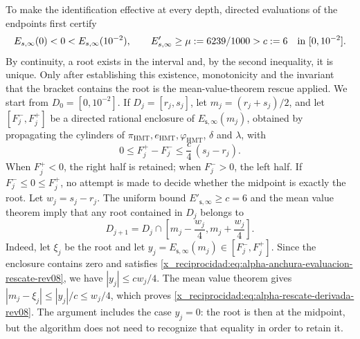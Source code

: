 To make the identification effective at every depth, directed
evaluations of the endpoints first certify
\[
 E_{\mathsf s,\infty}(0)<0<
 E_{\mathsf s,\infty}(10^{-2}),
 \qquad
 E'_{\mathsf s,\infty}\geq\mu:=6239/1000>c:=6
 \quad\hbox{in }[0,10^{-2}].
\]
By continuity, a root exists in the interval and, by the second inequality,
it is unique. Only after establishing this existence, monotonicity and the invariant
that the bracket contains the root is the mean-value-theorem
rescue applied. We start from \(D_0=[0,10^{-2}]\). If
\(D_j=[r_j,s_j]\), let \(m_j=(r_j+s_j)/2\), and let
\([F_j^-,F_j^+]\) be a directed rational enclosure of
\(E_{\mathsf s,\infty}(m_j)\), obtained by propagating the cylinders of
\(\pi_{\mathrm{HMT}},e_{\mathrm{HMT}},\varphi_{\mathrm{HMT}}\),
\(\delta\) and \(\lambda\), with
\begin{equation}
 0\leq F_j^+-F_j^-\leq \frac{c}{4}\,(s_j-r_j).
 \label{x_reciprocidad:eq:alpha-anchura-evaluacion-rescate-rev08}
\end{equation}
When \(F_j^+<0\), the right half is retained;
when \(F_j^->0\), the left half. If
\(F_j^-\leq0\leq F_j^+\), no attempt is made to decide whether the midpoint is
exactly the root. Let \(w_j=s_j-r_j\). The uniform bound
\(E'_{\mathsf s,\infty}\geq c=6\) and the mean value theorem imply that
any root contained in \(D_j\) belongs to
\begin{equation}
 D_{j+1}=D_j\cap
 \left[m_j-\frac{w_j}{4},
             m_j+\frac{w_j}{4}\right].
 \label{x_reciprocidad:eq:alpha-rescate-derivada-rev08}
\end{equation}
Indeed, let \(\xi_j\) be the root and let
\(y_j=E_{\mathsf s,\infty}(m_j)\in[F_j^-,F_j^+]\). Since the enclosure contains
zero and satisfies \eqref{x_reciprocidad:eq:alpha-anchura-evaluacion-rescate-rev08}, we have
\(|y_j|\leq cw_j/4\). The mean value theorem gives
\(|m_j-\xi_j|\leq |y_j|/c\leq w_j/4\), which proves
\eqref{x_reciprocidad:eq:alpha-rescate-derivada-rev08}. The argument includes the case
\(y_j=0\): the root is then at the midpoint, but the algorithm does not
need to recognize that equality in order to retain it.

